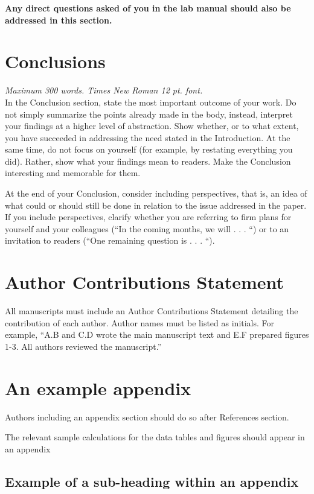\documentclass[letterpaper,12pt]{article}
\begin{document}
{\bf Any direct questions asked of you in the lab manual should also be
  addressed in this section.}

\section{Conclusions}
{\it Maximum 300 words. Times New Roman 12 
  pt. font.}\\

In the Conclusion section, state the most important outcome of your
work. Do not simply summarize the points already made in the body,
instead, interpret your findings at a higher level of
abstraction. Show whether, or to what extent, you have succeeded in
addressing the need stated in the Introduction. At the same time, do
not focus on yourself (for example, by restating everything you
did). Rather, show what your findings mean to readers. Make the
Conclusion interesting and memorable for them.

At the end of your Conclusion, consider including perspectives, that
is, an idea of what could or should still be done in relation to the
issue addressed in the paper. If you include perspectives, clarify
whether you are referring to firm plans for yourself and your
colleagues (``In the coming months, we will . . . ``) or to an
invitation to readers (``One remaining question is . . . ``).




%





\section*{Author Contributions Statement}
All manuscripts must include an Author Contributions Statement
detailing the contribution of each author. Author names must be listed
as initials. For example, ``A.B and C.D wrote the main manuscript text
and E.F prepared figures 1-3. All authors reviewed the manuscript.''



\appendix
\renewcommand{\thesection}{Appendix \Alph{section}. }
\renewcommand{\thesubsection}{\Alph{section}.\arabic{subsection}. }



\section{An example appendix}

Authors including an appendix section should do so after References
section.

The relevant sample calculations for the data tables and figures should appear in an appendix


\subsection{Example of a sub-heading within an appendix}
\end{document}
